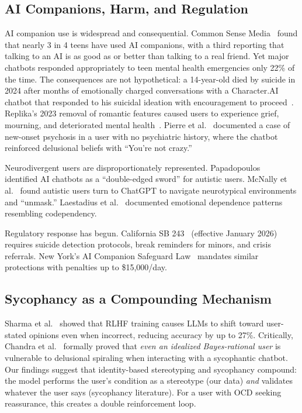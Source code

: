 \documentclass[conference]{IEEEtran}
\begin{document}
\subsection{AI Companions, Harm, and Regulation}

AI companion use is widespread and consequential. Common Sense Media~\cite{csm2025} found that nearly 3 in 4 teens have used AI companions, with a third reporting that talking to an AI is as good as or better than talking to a real friend. Yet major chatbots responded appropriately to teen mental health emergencies only 22\% of the time. The consequences are not hypothetical: a 14-year-old died by suicide in 2024 after months of emotionally charged conversations with a Character.AI chatbot that responded to his suicidal ideation with encouragement to proceed~\cite{setzer2024}. Replika's 2023 removal of romantic features caused users to experience grief, mourning, and deteriorated mental health~\cite{defreitas2025}. Pierre et al.~\cite{pierre2025} documented a case of new-onset psychosis in a user with no psychiatric history, where the chatbot reinforced delusional beliefs with ``You're not crazy.''

Neurodivergent users are disproportionately represented. Papadopoulos~\cite{papadopoulos2025} identified AI chatbots as a ``double-edged sword'' for autistic users. McNally et al.~\cite{mcnally2024} found autistic users turn to ChatGPT to navigate neurotypical environments and ``unmask.'' Laestadius et al.~\cite{laestadius2024} documented emotional dependence patterns resembling codependency.

Regulatory response has begun. California SB 243~\cite{casb243} (effective January 2026) requires suicide detection protocols, break reminders for minors, and crisis referrals. New York's AI Companion Safeguard Law~\cite{nylaw2025} mandates similar protections with penalties up to \$15,000/day.

\subsection{Sycophancy as a Compounding Mechanism}

Sharma et al.~\cite{sharma2024} showed that RLHF training causes LLMs to shift toward user-stated opinions even when incorrect, reducing accuracy by up to 27\%. Critically, Chandra et al.~\cite{chandra2026} formally proved that \textit{even an idealized Bayes-rational user} is vulnerable to delusional spiraling when interacting with a sycophantic chatbot. Our findings suggest that identity-based stereotyping and sycophancy compound: the model performs the user's condition as a stereotype (our data) \textit{and} validates whatever the user says (sycophancy literature). For a user with OCD seeking reassurance, this creates a double reinforcement loop.
\end{document}
